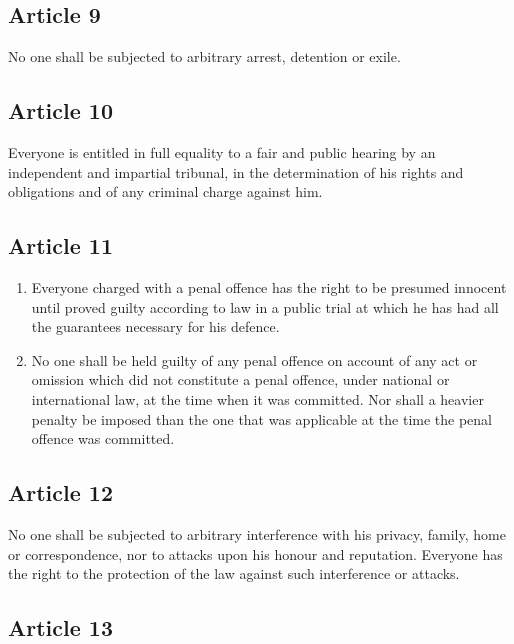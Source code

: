 \documentclass[
  titlepage,
  openright,
  DIV=calc,
  toc=listof,
  listof=nochaptergap]{scrbook}
\begin{document}
\subsection{Article 9}\label{article-9-3}

No one shall be subjected to arbitrary arrest, detention or exile.

\subsection{Article 10}\label{article-10-3}

Everyone is entitled in full equality to a fair and public hearing by an
independent and impartial tribunal, in the determination of his rights
and obligations and of any criminal charge against him.

\subsection{Article 11}\label{article-11-3}

\begin{enumerate}
\def\labelenumi{\arabic{enumi}.}
\item
  Everyone charged with a penal offence has the right to be presumed
  innocent until proved guilty according to law in a public trial at
  which he has had all the guarantees necessary for his defence.
\item
  No one shall be held guilty of any penal offence on account of any act
  or omission which did not constitute a penal offence, under national
  or international law, at the time when it was committed. Nor shall a
  heavier penalty be imposed than the one that was applicable at the
  time the penal offence was committed.
\end{enumerate}

\subsection{Article 12}\label{article-12-3}

No one shall be subjected to arbitrary interference with his privacy,
family, home or correspondence, nor to attacks upon his honour and
reputation. Everyone has the right to the protection of the law against
such interference or attacks.

\subsection{Article 13}\label{article-13-3}
\end{document}
